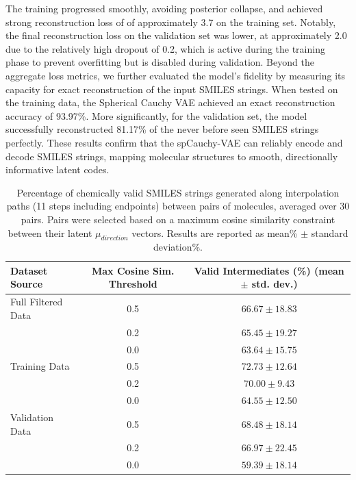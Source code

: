 \documentclass{article}
\begin{document}
The training progressed smoothly, avoiding posterior collapse, and achieved strong reconstruction loss of of approximately 3.7 on the training set. Notably, the final reconstruction loss on the validation set was lower, at approximately 2.0 due to the relatively high dropout of 0.2, which is active during the training phase to prevent overfitting but is disabled during validation. Beyond the aggregate loss metrics, we further evaluated the model's fidelity by measuring its capacity for exact reconstruction of the input SMILES strings. When tested on the training data, the Spherical Cauchy VAE achieved an exact reconstruction accuracy of 93.97\%. More significantly, for the validation set, the model successfully reconstructed 81.17\% of the never before seen SMILES strings perfectly. These results confirm that the spCauchy-VAE can reliably encode and decode SMILES strings, mapping molecular structures to smooth, directionally informative latent codes.

\begin{table}[!ht]
\centering
\caption{Percentage of chemically valid SMILES strings generated along interpolation paths (11 steps including endpoints) between pairs of molecules, averaged over 30 pairs. Pairs were selected based on a maximum cosine similarity constraint between their latent \(\mu_{direction}\) vectors. Results are reported as mean\% \(\pm\) standard deviation\%.}
\label{tab:interpolation_validity}
\begin{tabular}{lcc}
\toprule
Dataset Source     & Max Cosine Sim. Threshold & Valid Intermediates (\%) (mean \(\pm\) std. dev.) \\
\midrule
Full Filtered Data & 0.5                       & \(66.67 \pm 18.83\)                               \\
                   & 0.2                       & \(65.45 \pm 19.27\)                               \\
                   & 0.0                       & \(63.64 \pm 15.75\)                               \\
\midrule
Training Data      & 0.5                       & \(72.73 \pm 12.64\)                               \\
                   & 0.2                       & \(70.00 \pm 9.43\)                                \\
                   & 0.0                       & \(64.55 \pm 12.50\)                               \\
\midrule
Validation Data    & 0.5                       & \(68.48 \pm 18.14\)                               \\
                   & 0.2                       & \(66.97 \pm 22.45\)                               \\
                   & 0.0                       & \(59.39 \pm 18.14\)                               \\
\bottomrule
\end{tabular}
\end{table}
\end{document}
